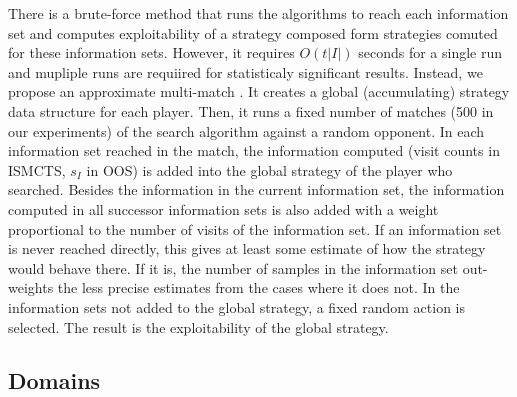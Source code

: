 \documentclass{aamas2015}
\newcounter{vlNoteCounter}
\newcommand{\vlnote}[1]{{\scriptsize \color{blue} $\blacksquare$ \refstepcounter{vlNoteCounter}\textsf{[VL]$_{\arabic{vlNoteCounter}}$:{#1}}}}
\renewcommand{\vlnote}[1]{}
\newcommand{\defword}[1]{\textbf{\boldmath{#1}}}
\begin{document}
There is a brute-force method that runs the algorithms to reach each information set and computes exploitability of a strategy composed form strategies comuted for these information sets. However, it requires $O(t |I|)$ seconds for a single run and mupliple runs are requiired for statisticaly significant results.
Instead, we propose an approximate multi-match \defword{aggregate method}. 
It creates a global (accumulating) strategy data structure for each player.
Then, it runs a fixed number of matches (500 in our experiments) of the search algorithm against a random opponent. In each information set reached in the match, the information computed (visit counts in ISMCTS, $s_I$ in OOS) is added into the global strategy of the player who searched.
Besides the information in the current information set, the information computed in all successor information sets is also added with a weight proportional to the number of visits of the information set.
If an information set is never reached directly, this gives at least some estimate of how the strategy would behave there. If it is, the number of samples in the information set out-weights the less precise estimates from the cases where it does not.  In the information sets not added to the global strategy, a fixed random action is selected. The result is the exploitability of the global strategy.


\subsection{Domains}
\vlnote{comment on domain sizes}
\end{document}
